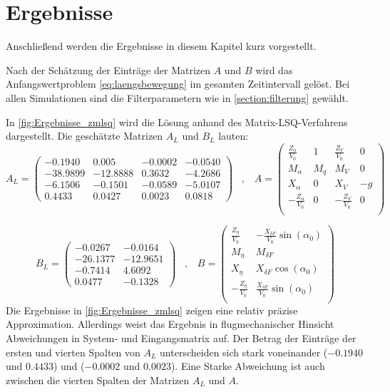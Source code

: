  
 \section{Ergebnisse}
 
Anschließend werden die Ergebnisse in diesem Kapitel kurz vorgestellt.

Nach der Schätzung der Einträge der Matrizen $A$ und $B$ wird das Anfangswertproblem \eqref{eq:laengsbewegung} im gesamten 
Zeitintervall gelöst. Bei allen Simulationen sind die Filterparametern wie in \ref{section:filterung} gewählt.

In \cref{fig:Ergebnisse_zmlsq} wird die Lösung anhand des Matrix-LSQ-Verfahrens dargestellt. Die geschätzte Matrizen $A_L$ und $B_L$ lauten: 
\begin{equation}
 	A_L = \begin{pmatrix}
 		-0.1940 & 0.005 & -0.0002 & -0.0540 \\
 		-38.9899 & -12.8888 & 0.3632 & -4.2686 \\
 		-6.1506 & -0.1501 & -0.0589 & -5.0107 \\
 		0.4433 & 0.0427 & 0.0023 & 0.0818
 	\end{pmatrix} \;\;\; , \;\;\;
 	A = \begin{pmatrix}
		\frac{Z_\alpha}{V_0} & 1 & \frac{Z_V}{V_0} & 0\\
		M_\alpha & M_q & M_V & 0\\
		X_\alpha & 0 & X_V & -g\\
		-\frac{Z_\alpha}{V_0} & 0 & -\frac{Z_V}{V_0} & 0\\
	\end{pmatrix}
	\nonumber
\end{equation}

\begin{equation}
 	 B_L = \begin{pmatrix}
 		-0.0267 & -0.0164 \\ 
 		-26.1377 & -12.9651 \\
 		-0.7414 & 4.6092 \\
 		0.0477 & -0.1328
 	\end{pmatrix}  \;\;\; , \;\;\;
 	B= \begin{pmatrix}
		\frac{Z_\eta}{V_0} & -\frac{X_{\delta F}}{V_0} \sin{(\alpha_0)}\\
		M_\eta & M_{\delta F}\\
		X_\eta & X_{\delta F} \cos{(\alpha_0)}\\
		-\frac{Z_\eta}{V_0} & \frac{X_{\delta F}}{V_0} \sin{(\alpha_0)}\\
	\end{pmatrix}
 \nonumber
\end{equation}
Die Ergebnisse in \cref{fig:Ergebnisse_zmlsq} zeigen eine relativ präzise Approximation. Allerdings weist das Ergebnis in flugmechanischer 
Hinsicht Abweichungen in System- und Eingangsmatrix auf. Der Betrag der Einträge der ersten und vierten Spalten von $A_L$ unterscheiden sich stark voneinander ($-0.1940$ und $0.4433$) und ($-0.0002$ und $0.0023$). Eine Starke Abweichung ist auch zwischen die vierten Spalten der Matrizen $A_L$ und $A$.  

